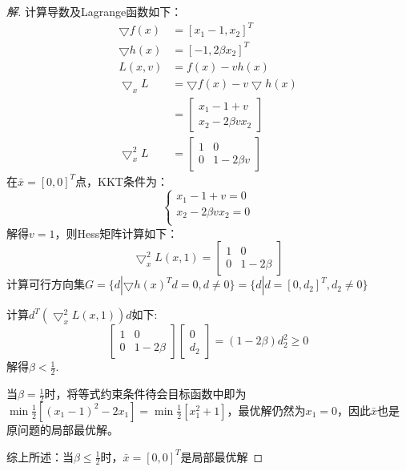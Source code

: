 \documentclass[a4paper]{article}
\begin{document}
\begin{proof}[解]
	计算导数及Lagrange函数如下：
	\begin{equation}
	\begin{aligned}
	\bigtriangledown f(x)&=[x_1-1,x_2]^T \\
	\bigtriangledown h(x)&=[-1,2\beta x_2]^T \\
	L(x,v)&=f(x)-vh(x) \\
	\bigtriangledown_x L&=\bigtriangledown f(x)-v\bigtriangledown h(x) \\
	&=\left[
	\begin{array}{c}
	x_1-1+v \\
	x_2-2\beta vx_2
	\end{array}
	\right]\\
	\bigtriangledown_x^2 L&= \left[
	\begin{array}{cc}
	1 & 0\\
	0 & 1-2\beta v
	\end{array}
	\right]
	\end{aligned}
	\end{equation}
	在$\bar{x}=[0,0]^T$点，KKT条件为：
	\begin{equation}
	\left\{
	\begin{array}{c}
	x_1-1+v=0 \\
	x_2-2\beta vx_2=0 \\
	\end{array}
	\right.
	\end{equation}
	解得$v=1$，则Hess矩阵计算如下：
	\begin{equation}
	\bigtriangledown_x^2 L(x,1)=\left[
	\begin{array}{cc}
	1 & 0\\
	0 & 1-2\beta
	\end{array}\right]
	\end{equation}
	计算可行方向集$G=\{d|\bigtriangledown h(x)^Td=0,d\neq0\}=\{d|d=[0,d_2]^T,d_2\neq0\}$
	
	计算$d^T(\bigtriangledown_x^2 L(x,1) )d$如下:
	\begin{equation}
	[0,d_2]\left[
	\begin{array}{cc}
	1 & 0\\
	0 & 1-2\beta
	\end{array}
	\right]\left[
	\begin{array}{c}
	0 \\
	d_2
	\end{array}
	\right]=(1-2\beta) d_2^2\ge 0
	\end{equation}
	解得$\beta < \frac{1}{2}$.
	
	当$\beta=\frac{1}{2}$时，将等式约束条件待会目标函数中即为$\min \frac{1}{2}[(x_1-1)^2-2x_1]=\min \frac{1}{2}[x_1^2+1]$，最优解仍然为$x_1=0$，因此$\bar{x}$也是原问题的局部最优解。
	
	综上所述：当$\beta \le \frac{1}{2}$时，$\bar{x}=[0,0]^T$是局部最优解
\end{proof}
\end{document}
